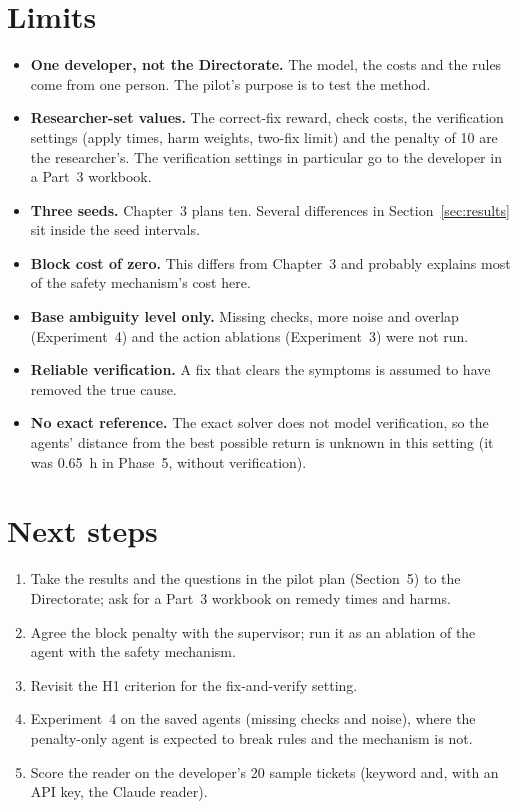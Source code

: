 \documentclass[11pt,a4paper]{article}
\begin{document}
\section{Limits}\label{sec:limits}

\begin{itemize}
  \item \textbf{One developer, not the Directorate.} The model, the costs and the rules come from one person. The pilot's purpose is to test the method.
  \item \textbf{Researcher-set values.} The correct-fix reward, check costs, the verification settings (apply times, harm weights, two-fix limit) and the penalty of 10 are the researcher's. The verification settings in particular go to the developer in a Part~3 workbook.
  \item \textbf{Three seeds.} Chapter~3 plans ten. Several differences in Section~\ref{sec:results} sit inside the seed intervals.
  \item \textbf{Block cost of zero.} This differs from Chapter~3 and probably explains most of the safety mechanism's cost here.
  \item \textbf{Base ambiguity level only.} Missing checks, more noise and overlap (Experiment~4) and the action ablations (Experiment~3) were not run.
  \item \textbf{Reliable verification.} A fix that clears the symptoms is assumed to have removed the true cause.
  \item \textbf{No exact reference.} The exact solver does not model verification, so the agents' distance from the best possible return is unknown in this setting (it was 0.65~h in Phase~5, without verification).
\end{itemize}

\section{Next steps}

\begin{enumerate}
  \item Take the results and the questions in the pilot plan (Section~5) to the Directorate; ask for a Part~3 workbook on remedy times and harms.
  \item Agree the block penalty with the supervisor; run it as an ablation of the agent with the safety mechanism.
  \item Revisit the H1 criterion for the fix-and-verify setting.
  \item Experiment~4 on the saved agents (missing checks and noise), where the penalty-only agent is expected to break rules and the mechanism is not.
  \item Score the reader on the developer's 20 sample tickets (keyword and, with an API key, the Claude reader).
\end{enumerate}
\end{document}
